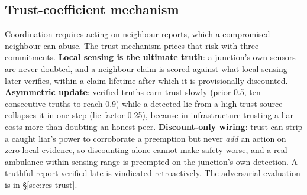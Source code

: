 \subsection{Trust-coefficient mechanism}\label{sec:des-trust}
Coordination requires acting on neighbour reports, which a compromised
neighbour can abuse. The trust mechanism prices that risk with three
commitments. \textbf{Local sensing is the ultimate truth}: a junction's
own sensors are never doubted, and a neighbour claim is scored against
what local sensing later verifies, within a claim lifetime after which it
is provisionally discounted. \textbf{Asymmetric update}: verified truths
earn trust slowly (prior 0.5, ten consecutive truths to reach 0.9) while a
detected lie from a high-trust source collapses it in one step (lie factor
0.25), because in infrastructure trusting a liar costs more than doubting
an honest peer. \textbf{Discount-only wiring}: trust can strip a caught
liar's power to corroborate a preemption but never \emph{add} an action on
zero local evidence, so discounting alone cannot make safety worse, and a
real ambulance within sensing range is preempted on the junction's own
detection. A truthful report verified late is vindicated retroactively.
The adversarial evaluation is in \S\ref{sec:res-trust}.
